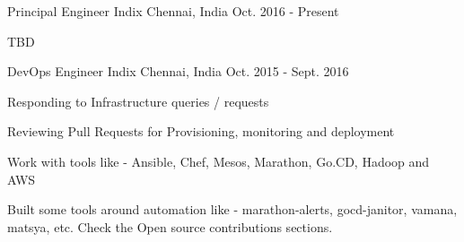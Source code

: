 

\begin{cventries}

  \cventry
    {Principal Engineer} %
    {Indix} %
    {Chennai, India} %
    {Oct. 2016 - Present} %
    {
      \begin{cvitems} %
        \item {TBD}
      \end{cvitems}
    }

  \cventry
    {DevOps Engineer} %
    {Indix} %
    {Chennai, India} %
    {Oct. 2015 - Sept. 2016} %
    {
      \begin{cvitems} %
        \item {Responding to Infrastructure queries / requests}
        \item {Reviewing Pull Requests for Provisioning, monitoring and deployment}
        \item {Work with tools like - Ansible, Chef, Mesos, Marathon, Go.CD, Hadoop and AWS}
        \item {Built some tools around automation like - marathon-alerts, gocd-janitor, vamana, matsya, etc.
        Check the Open source contributions sections. }
      \end{cvitems}
    }


\end{cventries}
